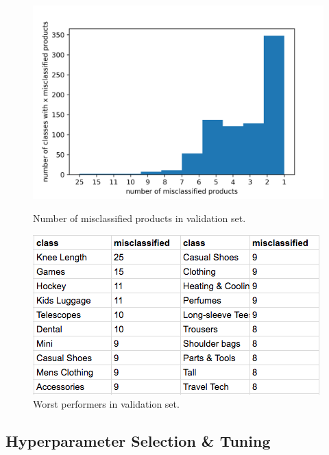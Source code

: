 \begin{figure}
\centering
\begin{minipage}{.48\textwidth}
  \centering
  \includegraphics[width=\linewidth]{figures/multiobj/misclassification_rates}
  \caption{Number of misclassified products in validation set.}
  \label{misclassification_rates}
\end{minipage}%
\begin{minipage}{.48\textwidth}
  \centering
  \includegraphics[width=\linewidth]{figures/multiobj/misclassified_top}
  \caption{Worst performers in validation set.}
  \label{misclassified_top}
\end{minipage}
\end{figure}


\subsection{Hyperparameter Selection \& Tuning}
\label{tuning}

